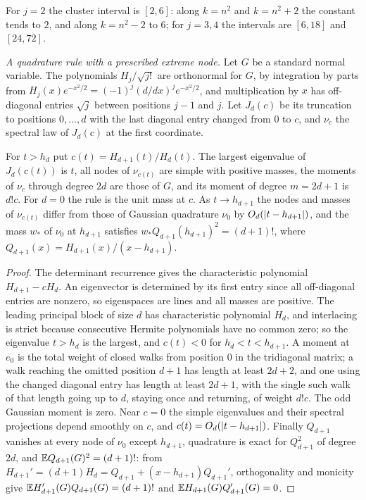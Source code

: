 For $j=2$ the cluster interval is $[2,6]$: along $k=n^2$ and $k=n^2+2$ the constant tends to $2$, and
along $k=n^2-2$ to $6$; for $j=3,4$ the intervals are $[6,18]$ and $[24,72]$.

\emph{A quadrature rule with a prescribed extreme node.} Let $G$ be a standard normal variable.
The polynomials $H_j/\sqrt{j!}$ are orthonormal for $G$, by integration by parts from
$H_j(x)e^{-x^2/2}=(-1)^j(d/dx)^je^{-x^2/2}$, and multiplication by $x$ has off-diagonal entries
$\sqrt j$ between positions $j-1$ and $j$. Let $J_d(c)$ be its truncation to positions
$0,\dots,d$ with the last diagonal entry changed from $0$ to $c$, and $\nu_c$ the spectral law of
$J_d(c)$ at the first coordinate.

\begin{lemma}\label{dir:lem:radau}
For $t>h_d$ put $c(t)=H_{d+1}(t)/H_d(t)$. The largest eigenvalue of $J_d(c(t))$ is $t$, all
nodes of $\nu_{c(t)}$ are simple with positive masses, the moments of $\nu_c$ through degree $2d$
are those of $G$, and its moment of degree $m=2d+1$ is $d!c$. For $d=0$ the rule is the unit mass
at $c$. As $t\to h_{d+1}$ the nodes and masses of $\nu_{c(t)}$ differ from those of Gaussian quadrature
$\nu_0$ by $O_d(\lvert t-h_{d+1}\rvert)$, and the mass $w_*$ of $\nu_0$ at $h_{d+1}$ satisfies
$w_*Q_{d+1}(h_{d+1})^2=(d+1)!$, where $Q_{d+1}(x)=H_{d+1}(x)/(x-h_{d+1})$.
\end{lemma}

\begin{proof}
The determinant recurrence gives the characteristic polynomial $H_{d+1}-cH_d$. An eigenvector
is determined by its first entry since all off-diagonal entries are nonzero, so eigenspaces are
lines and all masses are positive. The leading principal block of size $d$ has characteristic
polynomial $H_d$, and interlacing is strict because consecutive Hermite polynomials have no
common zero; so the eigenvalue $t>h_d$ is the largest, and $c(t)<0$ for $h_d<t<h_{d+1}$. A moment
at $e_0$ is the total weight of closed walks from position $0$ in the tridiagonal matrix; a walk
reaching the omitted position $d+1$ has length at least $2d+2$, and one using the changed
diagonal entry has length at least $2d+1$, with the single such walk of that length going up to
$d$, staying once and returning, of weight $d!c$. The odd Gaussian moment is zero. Near $c=0$ the
simple eigenvalues and their spectral projections depend smoothly on $c$, and $c(t)=O_d(\lvert t-h_{d+1}\rvert)$.
Finally $Q_{d+1}$ vanishes at every node of $\nu_0$ except $h_{d+1}$, quadrature is exact for
$Q_{d+1}^2$ of degree $2d$, and $\mathbb{E} Q_{d+1}(G)^2=(d+1)!$: from
$H_{d+1}'=(d+1)H_d=Q_{d+1}+(x-h_{d+1})Q_{d+1}'$, orthogonality and monicity give
$\mathbb{E} H_{d+1}'(G)Q_{d+1}(G)=(d+1)!$ and $\mathbb{E} H_{d+1}(G)Q_{d+1}'(G)=0$.
\end{proof}

